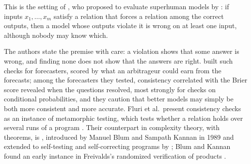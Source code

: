 \begin{refsection}
This is the setting of \textcite{FluriEtAl2024}, who proposed to evaluate superhuman models by : if inputs $x_1,\dots,x_m$ satisfy a relation that forces a relation among the correct outputs, then a model whose outputs violate it is wrong on at least one input, although nobody may know which.


The authors state the premise with care: a violation shows that some answer is wrong, and finding none does not show that the answers are right. \Textcite{PalekaEtAl2025} built such checks for forecasters, scored by what an arbitrageur could earn from the forecasts; among the forecasters they tested, consistency correlated with the Brier score revealed when the questions resolved, most strongly for checks on conditional probabilities, and they caution that better models may simply be both more consistent and more accurate. Fluri et al.\ present consistency checks as an instance of metamorphic testing, which tests whether a relation holds over several runs of a program \parencite{ChenEtAl2018}. Their counterpart in complexity theory, with theorems, is , introduced by Manuel Blum and Sampath Kannan in 1989 \parencite{BlumKannan1995} and extended to self-testing and self-correcting programs by \textcite{BlumLubyRubinfeld1993}; Blum and Kannan found an early instance in Freivalds's randomized verification of products \parencite{Freivalds1977,Freivalds1979}.


\end{refsection}
